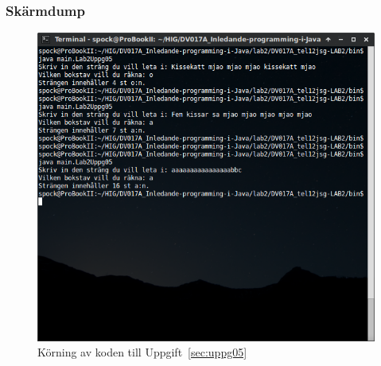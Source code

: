 \subsubsection{Skärmdump}
\begin{figure}[htbp]
    \centering
        \includegraphics[width=\linewidth]{img/05.png}
    \caption{Körning av koden till Uppgift~\ref{sec:uppg05}}
    \label{fig:uppg05-screenshot}
\end{figure}

